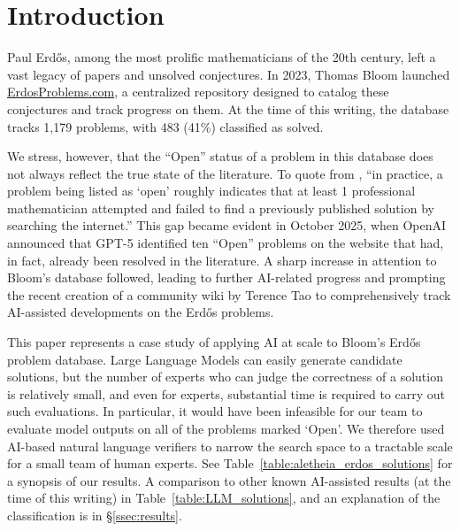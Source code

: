 \documentclass{article}
\theoremstyle{plain}
\theoremstyle{definition}
\begin{document}
\section{Introduction}
Paul Erdős, among the most prolific mathematicians of the 20th century, left a vast legacy of papers and unsolved conjectures. In 2023, Thomas Bloom launched \href{https://www.erdosproblems.com/}{\ttfamily ErdosProblems.com}, a centralized repository designed to catalog these conjectures and track progress on them. At the time of this writing, the database tracks 1,179 problems, with 483 (41\%) classified as solved.

We stress, however, that the ``Open'' status of a problem in this database does not always reflect the true state of the literature. To quote from \cite{bubeck2025earlyscienceaccelerationexperiments}, ``in practice, a problem being listed as `open' roughly indicates that at least 1 professional mathematician attempted and failed to find a previously published solution by searching the internet.'' This gap became evident in October 2025, when OpenAI announced that GPT-5 identified ten ``Open'' problems on the website that had, in fact, already been resolved in the literature. A sharp increase in attention to Bloom's database followed, leading to further AI-related progress and prompting the recent creation of a community wiki by Terence Tao \cite{tao2026erdosai} to comprehensively track AI-assisted developments on the Erd\H{o}s problems. 


This paper represents a case study of applying AI at scale to Bloom's Erd\H{o}s problem database. Large Language Models can easily generate candidate solutions, but the number of experts who can judge the correctness of a solution is relatively small, and even for experts, substantial time is required to carry out such evaluations. In particular, it would have been infeasible for our team to evaluate model outputs on all of the problems marked `Open'. We therefore used AI-based natural language verifiers to narrow the search space to a tractable scale for a small team of human experts. 
See Table~\ref{table:aletheia_erdos_solutions} for a synopsis of our results. A comparison to other known AI-assisted results (at the time of this writing) in Table~\ref{table:LLM_solutions}, and an explanation of the classification is in \S\ref{ssec:results}. 
\end{document}

